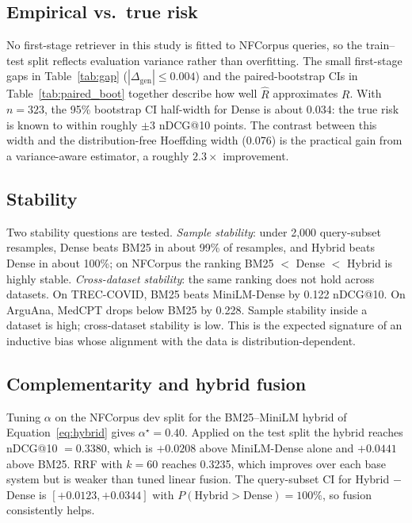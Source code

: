 \documentclass[11pt,a4paper]{article}
\begin{document}
\subsection{Empirical vs.\ true risk}
\label{subsec:risk}

No first-stage retriever in this study is fitted to NFCorpus queries,
so the train--test split reflects evaluation variance rather than
overfitting. The small first-stage gaps in Table~\ref{tab:gap}
($|\Delta_{\text{gen}}| \le 0.004$) and the paired-bootstrap CIs in
Table~\ref{tab:paired_boot} together describe how well $\hat{R}$
approximates $R$. With $n=323$, the 95\% bootstrap CI half-width for
Dense is about 0.034: the true risk is known to within roughly $\pm 3$
nDCG@10 points. The contrast between this width and the
distribution-free Hoeffding width (0.076) is the practical gain from a
variance-aware estimator, a roughly $2.3\times$ improvement.

\subsection{Stability}

Two stability questions are tested. \emph{Sample stability}: under
2{,}000 query-subset resamples, Dense beats BM25 in about 99\% of
resamples, and Hybrid beats Dense in about 100\%; on NFCorpus the
ranking BM25 $<$ Dense $<$ Hybrid is highly stable.
\emph{Cross-dataset stability}: the same ranking does not hold across
datasets. On TREC-COVID, BM25 beats MiniLM-Dense by 0.122 nDCG@10. On
ArguAna, MedCPT drops below BM25 by 0.228. Sample stability inside a
dataset is high; cross-dataset stability is low. This is the expected
signature of an inductive bias whose alignment with the data is
distribution-dependent.

\subsection{Complementarity and hybrid fusion}
\label{subsec:complementarity}

Tuning $\alpha$ on the NFCorpus dev split for the BM25--MiniLM hybrid
of Equation~\ref{eq:hybrid} gives $\alpha^\star = 0.40$. Applied on
the test split the hybrid reaches nDCG@10 $= 0.3380$, which is
$+0.0208$ above MiniLM-Dense alone and $+0.0441$ above BM25. RRF with
$k=60$ reaches 0.3235, which improves over each base system but is
weaker than tuned linear fusion. The query-subset CI for Hybrid $-$
Dense is $[+0.0123, +0.0344]$ with $P(\text{Hybrid}>\text{Dense})=100\%$,
so fusion consistently helps.
\end{document}
